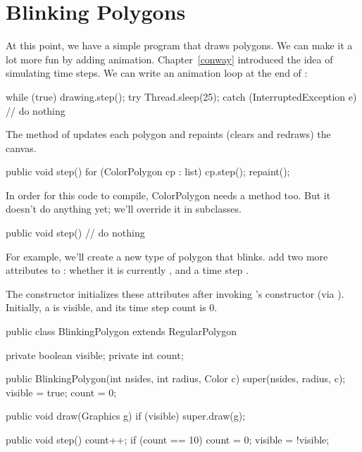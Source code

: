

\section{Blinking Polygons}

At this point, we have a simple program that draws polygons.
We can make it a lot more fun by adding animation.
Chapter~\ref{conway} introduced the idea of simulating time steps.
We can write an animation loop at the end of :

\begin{code}
while (true) {
    drawing.step();
    try {
        Thread.sleep(25);
    } catch (InterruptedException e) {
        // do nothing
    }
}
\end{code}

The  method of  updates each polygon and repaints (clears and redraws) the canvas.

\begin{code}
public void step() {
    for (ColorPolygon cp : list) {
        cp.step();
    }
    repaint();
}
\end{code}

In order for this code to compile, ColorPolygon needs a  method too.
But it doesn't do anything yet; we'll override it in subclasses.

\begin{code}
public void step() {
    // do nothing
}
\end{code}

For example, we'll create a new type of polygon that blinks.
 add two more attributes to : whether it is currently , and a time step .

The constructor initializes these attributes after invoking 's constructor (via ).
Initially, a  is visible, and its time step count is 0.

\begin{code}
public class BlinkingPolygon extends RegularPolygon {
    private boolean visible;
    private int count;

    public BlinkingPolygon(int nsides, int radius, Color c) {
        super(nsides, radius, c);
        visible = true;
        count = 0;
    }

    public void draw(Graphics g) {
        if (visible) {
            super.draw(g);
        }
    }

    public void step() {
        count++;
        if (count == 10) {
            count = 0;
            visible = !visible;
        }
    }
}
\end{code}

